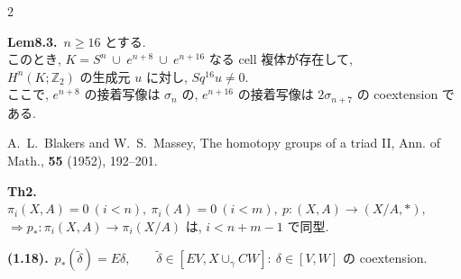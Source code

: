 \documentclass[10pt, leqno]{ltjsarticle}
\newcommand{\pis}[2]{\pi_{#1}(#2)}       %
\newcommand{\z}{\mathbb{Z}}
\numberwithin{equation}{section}
\theoremstyle{plain}
\theoremstyle{definition}
\theoremstyle{remark}
\begin{document}
\begin{paracol}{2}
\switchcolumn

\noindent
\textbf{Lem8.3.}\
$n\ge16$ とする. \\
このとき,
\(K=S^n\ \cup\ e^{n+8}\ \cup\ e^{n+16}\)
なる \textnormal{cell} 複体が存在して, \\
$H^n(K;\z_2)$ の生成元 $u$ に対し,
\(Sq^{16}u\ne0.\)\\
ここで, 
\(e^{n+8}\) の接着写像は \(\sigma_n\) の,
\(e^{n+16}\) の接着写像は \(2\sigma_{n+7}\) の \textnormal{coextension} である.

\noindent
\cite{BlakersMassey1952}
A.~L.~Blakers and W.~S.~Massey,
\newblock The homotopy groups of a triad II,
\newblock Ann. of Math., {\bf 55} (1952), 192--201.

\noindent
\textbf{Th2.}\ \(\pi_i(X,A)=0\ (i<n),\ \pi_i(A)=0\ (i<m),\ 
p:(X,A)\to(X/A,*),\)\\
\(\Longrightarrow p_*:\pis{i}{X,A}\to\pis{i}{X/A}\)
は, \(i<n+m-1\) で同型. 

\noindent
\textbf{(1.18).}\
\(p_*(\widetilde{\delta}) = E\delta,\qquad
\widetilde{\delta}\in[EV, X\cup_\gamma CW]:\
\delta\in [V,W]\) の coextension.




\end{paracol}
\end{document}
